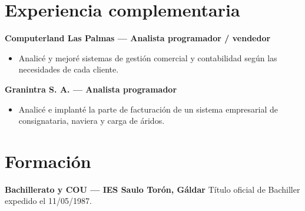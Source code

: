 \documentclass[11pt,a4paper]{article}
\begin{document}
\section*{Experiencia complementaria}
\textbf{Computerland Las Palmas — Analista programador / vendedor}
\begin{itemize}[leftmargin=*,nosep]
\item Analicé y mejoré sistemas de gestión comercial y contabilidad según las necesidades de cada cliente.
\end{itemize}
\textbf{Granintra S. A. — Analista programador}
\begin{itemize}[leftmargin=*,nosep]
\item Analicé e implanté la parte de facturación de un sistema empresarial de consignataria, naviera y carga de áridos.
\end{itemize}

\section*{Formación}
\textbf{Bachillerato y COU — IES Saulo Torón, Gáldar}
Título oficial de Bachiller expedido el 11/05/1987.\\
\end{document}
